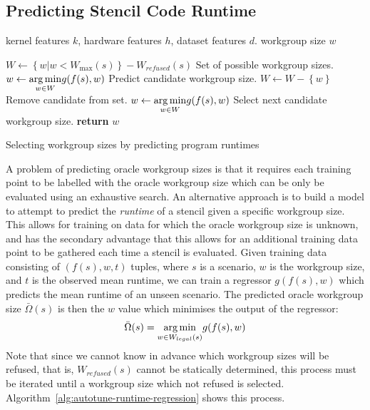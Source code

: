 \subsection{Predicting Stencil Code Runtime}\label{subsec:omnitune-ml-runtime}

\begin{algorithm}
\begin{algorithmic}[1]
\Require kernel features $k$, hardware features $h$, dataset features
$d$.
\Ensure workgroup size $w$

\State $W \leftarrow \left\{ w | w < W_{\max}(s) \right\} - W_{refused}(s)$
\Comment Set of possible workgroup sizes.
\State $w \leftarrow \underset{w \in W}{\operatorname*{arg\,min}} g(f(s), w)$
\Comment Predict candidate workgroup size.
  \State $W \leftarrow W - \left\{ w \right\}$
  \Comment Remove candidate from set.
  \State $w \leftarrow \underset{w \in W}{\operatorname*{arg\,min}} g(f(s), w)$
  \Comment Select next candidate workgroup size.
\EndWhile
\State \textbf{return} $w$
\end{algorithmic}
\caption{Selecting workgroup sizes by predicting program runtimes}
\label{alg:autotune-runtime-regression}
\end{algorithm}

A problem of predicting oracle workgroup sizes is that it requires
each training point to be labelled with the oracle workgroup size
which can be only be evaluated using an exhaustive search. An
alternative approach is to build a model to attempt to predict the
\emph{runtime} of a stencil given a specific workgroup size. This
allows for training on data for which the oracle workgroup size is
unknown, and has the secondary advantage that this allows for an
additional training data point to be gathered each time a stencil is
evaluated. Given training data consisting of $(f(s),w,t)$ tuples,
where $s$ is a scenario, $w$ is the workgroup size, and $t$ is the
observed mean runtime, we can train a regressor $g(f(s), w)$ which
predicts the mean runtime of an unseen scenario. The predicted oracle
workgroup size $\bar{\Omega}(s)$ is then the $w$ value which minimises
the output of the regressor:
%
\begin{equation}
  \bar{\Omega}(s) = \underset{w \in W_{legal}(s)}{\operatorname*{arg\,min}} g(f(s), w)
\end{equation}
%
Note that since we cannot know in advance which workgroup sizes will
be refused, that is, $W_{refused}(s)$ cannot be statically determined,
this process must be iterated until a workgroup size which not refused
is selected. Algorithm~\ref{alg:autotune-runtime-regression} shows
this process.


